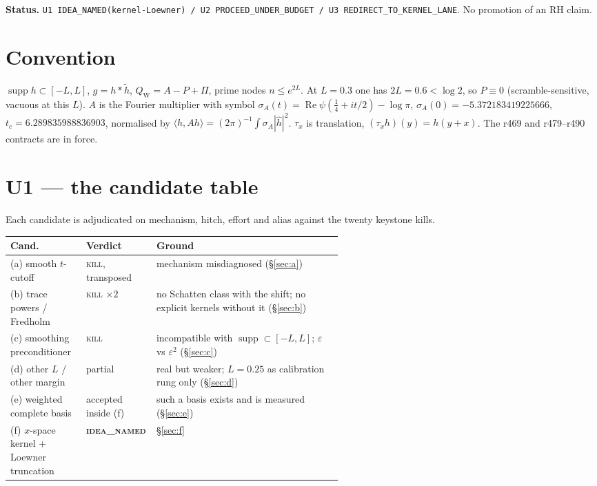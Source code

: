 \documentclass[11pt]{article}
\theoremstyle{remark}
\newcommand{\QW}{Q_{\mathrm W}}
\begin{document}
\medskip\noindent
\textbf{Status.}\enspace
\texttt{U1 IDEA\_NAMED(kernel-Loewner) / U2 PROCEED\_UNDER\_BUDGET / U3 REDIRECT\_TO\_KERNEL\_LANE}.
No promotion of an RH claim.

\begin{center}
\end{center}

\section{Convention}

$\operatorname{supp}h\subset[-L,L]$, $g=h*\widetilde h$,
$\QW=A-P+\Pi$, prime nodes $n\le e^{2L}$.
At $L=0.3$ one has $2L=0.6<\log2$, so $P\equiv0$
(scramble-sensitive, vacuous at this $L$).
$A$ is the Fourier multiplier with symbol
$\sigma_A(t)=\operatorname{Re}\psi(\tfrac14+it/2)-\log\pi$,
$\sigma_A(0)=-5.372183419225666$,
$t_c=6.289835988836903$,
normalised by
$\langle h,Ah\rangle=(2\pi)^{-1}\int\sigma_A|\hat h|^2$.
$\tau_x$ is translation, $(\tau_xh)(y)=h(y+x)$.
The r469 and r479--r490 contracts are in force.

\section{U1 --- the candidate table}

Each candidate is adjudicated on mechanism, hitch, effort and
alias against the twenty keystone kills.

\begin{center}
\small
\begin{tabular}{@{}llp{0.56\linewidth}@{}}
\toprule
Cand. & Verdict & Ground \\
\midrule
(a) smooth $t$-cutoff
  & \textsc{kill}, transposed
  & mechanism misdiagnosed (\S\ref{sec:a}) \\
(b) trace powers / Fredholm
  & \textsc{kill} $\times2$
  & no Schatten class with the shift; no explicit kernels
    without it (\S\ref{sec:b}) \\
(c) smoothing preconditioner
  & \textsc{kill}
  & incompatible with $\operatorname{supp}\subset[-L,L]$;
    $\varepsilon$ vs $\varepsilon^2$ (\S\ref{sec:c}) \\
(d) other $L$ / other margin
  & partial
  & real but weaker; $L=0.25$ as calibration rung only
    (\S\ref{sec:d}) \\
(e) weighted complete basis
  & accepted inside (f)
  & such a basis exists and is measured (\S\ref{sec:e}) \\
(f) $x$-space kernel + Loewner truncation
  & \textbf{\textsc{idea\_named}}
  & \S\ref{sec:f} \\
\bottomrule
\end{tabular}
\end{center}
\end{document}
